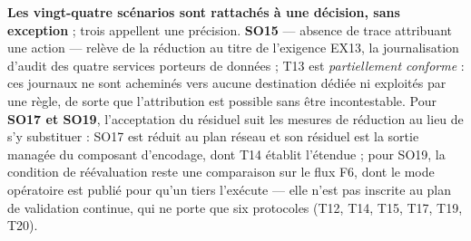 \textbf{Les vingt-quatre scénarios sont rattachés à une décision, sans exception} ; trois
appellent une précision. \textbf{SO15} --- absence de trace attribuant une action --- relève de la
réduction au titre de l'exigence EX13, la journalisation d'audit des quatre services porteurs de
données ; T13 est \emph{partiellement conforme} : ces journaux ne sont acheminés vers aucune
destination dédiée ni exploités par une règle, de sorte que l'attribution est possible sans être
incontestable. Pour \textbf{SO17 et SO19}, l'acceptation du résiduel suit les mesures de réduction
au lieu de s'y substituer : SO17 est réduit au plan réseau et son résiduel est la sortie managée
du composant d'encodage, dont T14 établit l'étendue ; pour SO19, la condition de réévaluation
reste une comparaison sur le flux F6, dont le mode opératoire est publié pour qu'un tiers
l'exécute --- elle n'est pas inscrite au plan de validation continue, qui ne porte que six
protocoles (T12, T14, T15, T17, T19, T20).
